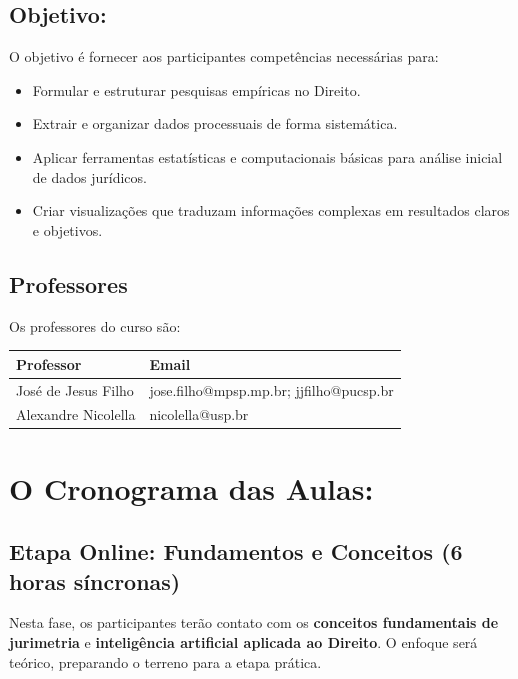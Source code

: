 \documentclass[
  letterpaper,
  DIV=11,
  numbers=noendperiod]{scrreprt}
\providecommand{\tightlist}{%
  \setlength{\itemsep}{0pt}\setlength{\parskip}{0pt}}
\begin{document}
\section{\texorpdfstring{\textbf{Objetivo}:}{Objetivo:}}\label{objetivo-1}

O objetivo é fornecer aos participantes competências necessárias para:

\begin{itemize}
\tightlist
\item
  Formular e estruturar pesquisas empíricas no Direito.
\item
  Extrair e organizar dados processuais de forma sistemática.
\item
  Aplicar ferramentas estatísticas e computacionais básicas para análise
  inicial de dados jurídicos.
\item
  Criar visualizações que traduzam informações complexas em resultados
  claros e objetivos.
\end{itemize}

\section{\texorpdfstring{\textbf{Professores}}{Professores}}\label{professores}

Os professores do curso são:

\begin{longtable}[]{@{}ll@{}}
\toprule\noalign{}
Professor & Email \\
\midrule\noalign{}
\endhead
\bottomrule\noalign{}
\endlastfoot
José de Jesus Filho & jose.filho@mpsp.mp.br; jjfilho@pucsp.br \\
Alexandre Nicolella & nicolella@usp.br \\
\end{longtable}


\chapter{O Cronograma das Aulas:}\label{o-cronograma-das-aulas}

\section{Etapa Online: Fundamentos e Conceitos (6 horas
síncronas)}\label{etapa-online-fundamentos-e-conceitos-6-horas-suxedncronas}

Nesta fase, os participantes terão contato com os \textbf{conceitos
fundamentais de jurimetria} e \textbf{inteligência artificial aplicada
ao Direito}. O enfoque será teórico, preparando o terreno para a etapa
prática.
\end{document}
